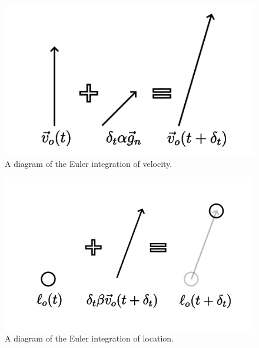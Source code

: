 \documentclass[12pt]{article}
\begin{document}
\begin{figure} 
\centering
\label{fig7}
  \includegraphics[width = 6 in]{velocity.png}
  \caption{
A diagram of the Euler integration of velocity.
}
\end{figure}

\begin{figure} 
\centering
\label{fig8}
  \includegraphics[width = 6 in]{location.png}
  \caption{
A diagram of the Euler integration of location.
}
\end{figure}
\end{document}
